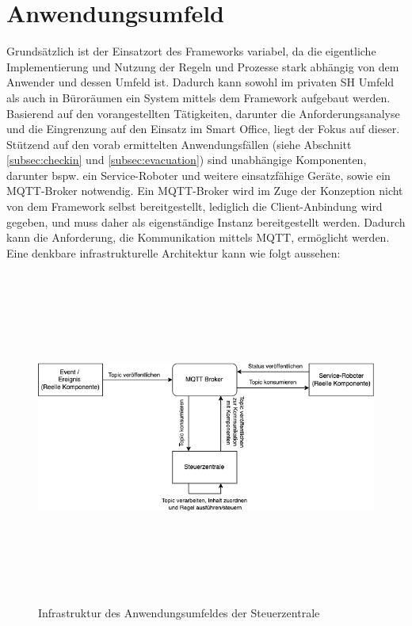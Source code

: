 \section{Anwendungsumfeld}
\label{sec:anwendungsumfeld}
    Grundsätzlich ist der Einsatzort des Frameworks variabel, da die eigentliche Implementierung und Nutzung der Regeln und Prozesse stark 
    abhängig von dem Anwender und dessen Umfeld ist. Dadurch kann sowohl im privaten \acl{SH} Umfeld als auch in Büroräumen ein System mittels dem 
    Framework aufgebaut werden. Basierend auf den vorangestellten Tätigkeiten, darunter die Anforderungsanalyse und die Eingrenzung auf den 
    Einsatz im Smart Office, liegt der Fokus auf dieser. %
    \\
    \linebreak
    Stützend auf den vorab ermittelten Anwendungsfällen (siehe Abschnitt \ref{subsec:checkin} und \ref{subsec:evacuation}) sind unabhängige 
    Komponenten, darunter bspw. ein Service-Roboter und weitere einsatzfähige Geräte, sowie ein \acs{MQTT}-Broker notwendig. Ein \acs{MQTT}-Broker 
    wird im Zuge der Konzeption nicht von dem Framework selbst bereitgestellt, lediglich die Client-Anbindung wird gegeben, und muss daher als eigenständige 
    Instanz bereitgestellt werden. Dadurch kann die Anforderung, die Kommunikation mittels \acs{MQTT}, ermöglicht werden. Eine denkbare infrastrukturelle 
    Architektur kann wie folgt aussehen: 
    \begin{figure}[hbt!]
        \centering
        \includegraphics[width=14cm,height=11cm,keepaspectratio]{images/Systemarchitektur.png}
        \caption{Infrastruktur des Anwendungsumfeldes der Steuerzentrale}
        \label{fig:infrastructure}
    \end{figure}

